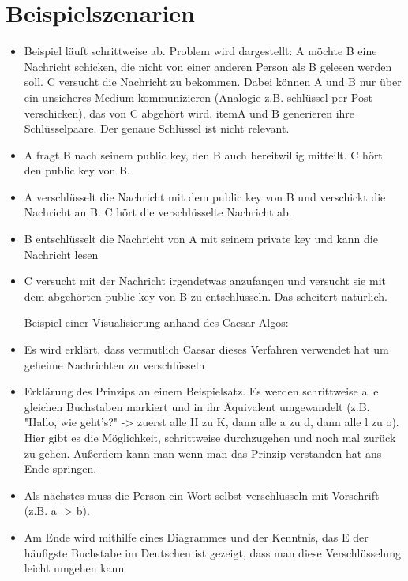 \documentclass{article}
\begin{document}
\section{Beispielszenarien}
\begin{itemize}
    \item Beispiel läuft schrittweise ab. Problem wird dargestellt: A möchte B eine Nachricht schicken, die nicht von einer anderen Person als B gelesen werden soll. C versucht die Nachricht zu bekommen. Dabei können A und B nur über ein unsicheres Medium kommunizieren (Analogie z.B. schlüssel per Post verschicken), das von C abgehört wird.
itemA und B generieren ihre Schlüsselpaare. Der genaue Schlüssel ist nicht relevant.
\item A fragt B nach seinem public key, den B auch bereitwillig mitteilt. C hört den public key von B.
\item A verschlüsselt die Nachricht mit dem public key von B und verschickt die Nachricht an B. C hört die verschlüsselte Nachricht ab.
\item B entschlüsselt die Nachricht von A mit seinem private key und kann die Nachricht lesen
\item C versucht mit der Nachricht irgendetwas anzufangen und versucht sie mit dem abgehörten public key von B zu entschlüsseln. Das scheitert natürlich.

Beispiel einer Visualisierung anhand des Caesar-Algos:

\item Es wird erklärt, dass vermutlich Caesar dieses Verfahren verwendet hat um geheime Nachrichten zu verschlüsseln
\item Erklärung des Prinzips an einem Beispielsatz. Es werden schrittweise alle gleichen Buchstaben markiert und in ihr Äquivalent umgewandelt (z.B. "Hallo, wie geht's?" -> zuerst alle H zu K, dann alle a zu d, dann alle l zu o). Hier gibt es die Möglichkeit, schrittweise durchzugehen und noch mal zurück zu gehen. Außerdem kann man wenn man das Prinzip verstanden hat ans Ende springen.
\item Als nächstes muss die Person ein Wort selbst verschlüsseln mit Vorschrift (z.B. a -> b).
\item Am Ende wird mithilfe eines Diagrammes und der Kenntnis, das E der häufigste Buchstabe im Deutschen ist gezeigt, dass man diese Verschlüsselung leicht umgehen kann
\end{itemize}
\end{document}
